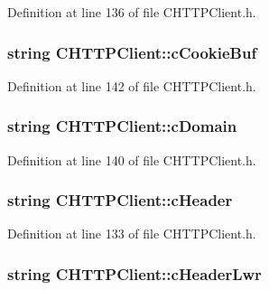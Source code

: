 \-Definition at line 136 of file \-C\-H\-T\-T\-P\-Client.\-h.

\hypertarget{class_c_h_t_t_p_client_aead239b82d8415a05884cafebf5a384a}{
\subsubsection[{c\-Cookie\-Buf}]{\setlength{\rightskip}{0pt plus 5cm}string {\bf \-C\-H\-T\-T\-P\-Client\-::c\-Cookie\-Buf}}}\label{class_c_h_t_t_p_client_aead239b82d8415a05884cafebf5a384a}


\-Definition at line 142 of file \-C\-H\-T\-T\-P\-Client.\-h.

\hypertarget{class_c_h_t_t_p_client_ab9788ca9dcc416a443622abb3ce44b70}{
\subsubsection[{c\-Domain}]{\setlength{\rightskip}{0pt plus 5cm}string {\bf \-C\-H\-T\-T\-P\-Client\-::c\-Domain}}}\label{class_c_h_t_t_p_client_ab9788ca9dcc416a443622abb3ce44b70}


\-Definition at line 140 of file \-C\-H\-T\-T\-P\-Client.\-h.

\hypertarget{class_c_h_t_t_p_client_ab8d840e3a99e3092df067a218c25e621}{
\subsubsection[{c\-Header}]{\setlength{\rightskip}{0pt plus 5cm}string {\bf \-C\-H\-T\-T\-P\-Client\-::c\-Header}}}\label{class_c_h_t_t_p_client_ab8d840e3a99e3092df067a218c25e621}


\-Definition at line 133 of file \-C\-H\-T\-T\-P\-Client.\-h.

\hypertarget{class_c_h_t_t_p_client_a71cb458d2508e65189f0c65dba6d465d}{
\subsubsection[{c\-Header\-Lwr}]{\setlength{\rightskip}{0pt plus 5cm}string {\bf \-C\-H\-T\-T\-P\-Client\-::c\-Header\-Lwr}}}\label{class_c_h_t_t_p_client_a71cb458d2508e65189f0c65dba6d465d}



